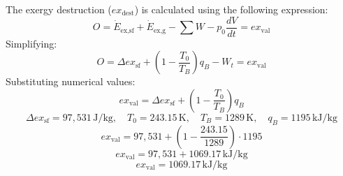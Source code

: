 The exergy destruction (\( ex_{\text{dest}} \)) is calculated using the following expression:  
\[
O = \dot{E}_{\text{ex,sf}} + \dot{E}_{\text{ex,g}} - \sum W - p_0 \frac{dV}{dt} = ex_{\text{val}}
\]  
Simplifying:  
\[
O = \Delta ex_{\text{sf}} + (1 - \frac{T_0}{T_B}) q_B - W_t = ex_{\text{val}}
\]  
Substituting numerical values:  
\[
ex_{\text{val}} = \Delta ex_{\text{sf}} + (1 - \frac{T_0}{T_B}) q_B
\]  
\[
\Delta ex_{\text{sf}} = 97,531 \, \text{J/kg}, \quad T_0 = 243.15 \, \text{K}, \quad T_B = 1289 \, \text{K}, \quad q_B = 1195 \, \text{kJ/kg}
\]  
\[
ex_{\text{val}} = 97,531 + (1 - \frac{243.15}{1289}) \cdot 1195
\]  
\[
ex_{\text{val}} = 97,531 + 1069.17 \, \text{kJ/kg}
\]  
\[
ex_{\text{val}} = 1069.17 \, \text{kJ/kg}
\]